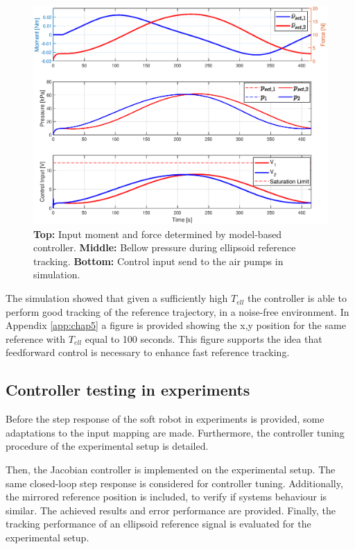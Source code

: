 \begin{figure}[H]
    \centering
    \includegraphics[width = \textwidth]{Figures/Chapter5/controlinputellipssim.eps}
    \caption{\textbf{Top:} Input moment and force determined by model-based controller. \textbf{Middle:} Bellow pressure during ellipsoid reference tracking. \textbf{Bottom:} Control input send to the air pumps in simulation.}
    \label{fig5:controlinputellipssim}
\end{figure}

The simulation showed that given a sufficiently high $T_{ell}$ the controller is able to perform good tracking of the reference trajectory, in a noise-free environment. In Appendix \ref{app:chap5} a figure is provided showing the x,y position for the same reference with $T_{ell}$ equal to 100 seconds. This figure supports the idea that feedforward control is necessary to enhance fast reference tracking.

\subsection{Controller testing in experiments}



Before the step response of the soft robot in experiments is provided, some adaptations to the input mapping are made. Furthermore, the controller tuning procedure of the experimental setup is detailed. 



Then, the Jacobian controller is implemented on the experimental setup. The same closed-loop step response is considered for controller tuning. Additionally, the mirrored reference position is included, to verify if systems behaviour is similar. The achieved results and error performance are provided. Finally, the tracking performance of an ellipsoid reference signal is evaluated for the experimental setup. 



